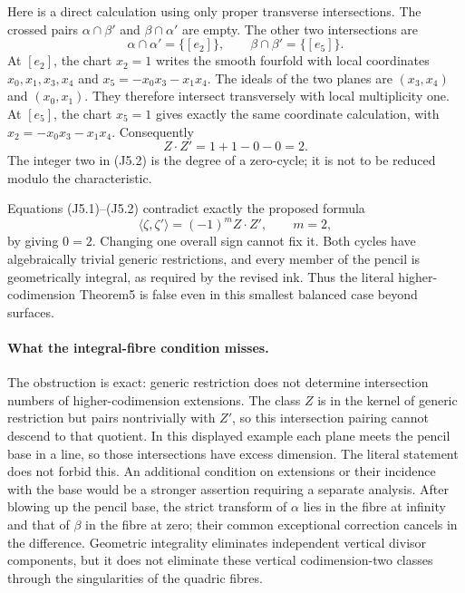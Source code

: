 Here is a direct calculation using only proper transverse
intersections. The crossed pairs $\alpha\cap\beta'$ and
$\beta\cap\alpha'$ are empty. The other two intersections are
\[
 \alpha\cap\alpha'=\{[e_2]\},\qquad
 \beta\cap\beta'=\{[e_5]\}.
\]
At $[e_2]$, the chart $x_2=1$ writes the smooth fourfold with local
coordinates $x_0,x_1,x_3,x_4$ and
$x_5=-x_0x_3-x_1x_4$. The ideals of the two planes are
$(x_3,x_4)$ and $(x_0,x_1)$. They therefore intersect transversely
with local multiplicity one. At $[e_5]$, the chart $x_5=1$
gives exactly the same coordinate calculation, with
$x_2=-x_0x_3-x_1x_4$. Consequently
\[
                  Z\cdot Z'=1+1-0-0=2.                 \tag{J5.2}
\]
The integer two in (J5.2) is the degree of a zero-cycle; it is not
to be reduced modulo the characteristic.

Equations (J5.1)--(J5.2) contradict exactly the proposed formula
\[
             \langle\zeta,\zeta'\rangle
                       =(-1)^m Z\cdot Z',
                  \qquad m=2,
\]
by giving $0=2$. Changing one overall sign cannot fix it.
Both cycles have algebraically trivial generic restrictions, and
every member of the pencil is geometrically integral, as required
by the revised ink. Thus the literal higher-codimension Theorem5
is false even in this smallest balanced case beyond surfaces.

\paragraph{What the integral-fibre condition misses.}
The obstruction is exact: generic restriction does not determine
intersection numbers of higher-codimension extensions. The class
$Z$ is in the kernel of generic restriction but pairs nontrivially with $Z'$,
so this intersection pairing cannot descend to that quotient.
In this displayed example each plane meets the pencil base in a line,
so those intersections have excess dimension. The literal statement
does not forbid this. An additional condition on extensions or their
incidence with the base would be a stronger assertion requiring a
separate analysis. After blowing up the pencil base, the strict transform of $\alpha$
lies in the fibre at infinity and that of $\beta$ in the fibre at
zero; their common exceptional correction cancels in the difference.
Geometric integrality eliminates independent vertical divisor
components, but it does not eliminate these vertical codimension-two
classes through the singularities of the quadric fibres.

